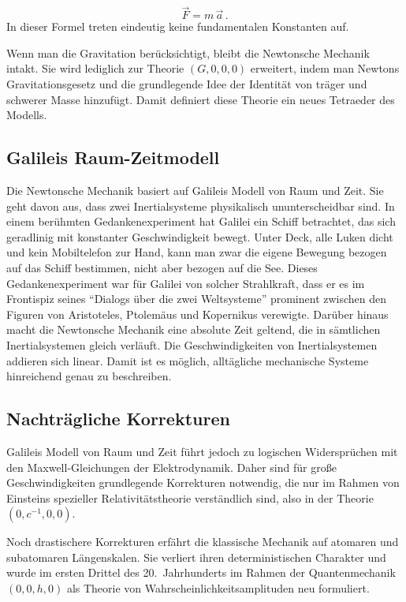 \begin{equation*}
  \vec{F} =m\, \vec{a}\,.
\end{equation*}
%
In dieser Formel treten eindeutig keine fundamentalen Konstanten auf.

Wenn man die Gravitation berücksichtigt, bleibt die Newtonsche Mechanik intakt. Sie wird lediglich zur Theorie $(G,0,0,0)$ erweitert, indem man Newtons Gravitationsgesetz und die grundlegende Idee der Identität von träger und schwerer Masse hinzufügt. Damit definiert diese Theorie ein neues Tetraeder des Modells.


\subsection*{Galileis Raum-Zeitmodell}

Die Newtonsche Mechanik basiert auf Galileis Modell von Raum und Zeit. Sie geht davon aus, dass zwei Inertialsysteme physikalisch ununterscheidbar sind. In einem berühmten Gedankenexperiment hat Galilei ein Schiff betrachtet, das sich geradlinig mit konstanter Geschwindigkeit bewegt. Unter Deck, alle Luken dicht und kein Mobiltelefon zur Hand, kann man zwar die eigene Bewegung bezogen auf das Schiff bestimmen, nicht aber bezogen auf die See. Dieses Gedankenexperiment war für Galilei von solcher Strahlkraft, dass er es im Frontispiz seines \enquote{Dialogs über die zwei Weltsysteme} prominent zwischen den Figuren von Aristoteles, Ptolemäus und Kopernikus verewigte. Darüber hinaus macht die Newtonsche Mechanik eine absolute Zeit geltend, die in sämtlichen Inertialsystemen gleich verläuft. Die Geschwindigkeiten von Inertialsystemen addieren sich linear. Damit ist es möglich, alltägliche mechanische Systeme hinreichend genau zu beschreiben.


\subsection*{Nachträgliche Korrekturen}

Galileis Modell von Raum und Zeit führt jedoch zu logischen Widersprüchen mit den Maxwell-Gleichungen der Elektrodynamik. Daher sind für große Geschwindigkeiten grundlegende Korrekturen notwendig, die nur im Rahmen von Einsteins spezieller Relativitätstheorie verständlich sind, also in der Theorie $(0,c^{-1},0,0)$.

Noch drastischere Korrekturen erfährt die klassische Mechanik auf atomaren und subatomaren Längenskalen. Sie verliert ihren deterministischen Charakter und wurde im ersten Drittel des 20.\ Jahrhunderts im Rahmen der Quantenmechanik $(0,0,h,0)$ als Theorie von Wahrscheinlichkeitsamplituden neu formuliert.

